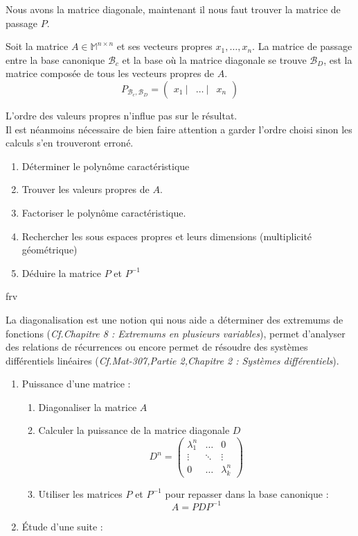Nous avons la matrice diagonale, maintenant il nous faut trouver la matrice de passage $P$.
\begin{prop}
Soit la matrice $A\in\mathbb{M}^{n\times n}$ et ses vecteurs propres $x_1,\hdots,x_n$.
La matrice de passage entre la base canonique $\mathscr{B}_c$ et la base où la matrice diagonale se trouve $\mathscr{B}_D$, est la matrice composée de tous les vecteurs propres de $A$.
$$P_{\mathscr{B}_c,\mathscr{B}_D}=\begin{pmatrix}x_1\ |& \hdots\ | & x_n\end{pmatrix}$$
\end{prop}

L'ordre des valeurs propres n'influe pas sur le résultat.\\
Il est néanmoins nécessaire de bien faire attention a garder l'ordre choisi sinon les calculs s'en trouveront erroné.
\begin{meth}
\begin{enumerate}
    \item Déterminer le polynôme caractéristique
    \item Trouver les valeurs propres de $A$.
    \item Factoriser le polynôme caractéristique.
    \item Rechercher les sous espaces propres et leurs dimensions (multiplicité géométrique)
    \item Déduire la matrice $P$ et $P^{-1}$
\end{enumerate}
\end{meth}
\begin{ex}
frv
\end{ex}
La diagonalisation est une notion qui nous aide a déterminer des extremums de fonctions (\textit{Cf.Chapitre 8 : Extremums en plusieurs variables}), permet d'analyser des relations de récurrences ou encore permet de résoudre des systèmes différentiels linéaires (\textit{Cf.Mat-307,Partie 2,Chapitre 2 : Systèmes différentiels}).
\begin{meth}[]
\begin{enumerate}
    \item Puissance d'une matrice :
    \begin{enumerate}
        \item Diagonaliser la matrice $A$
        \item Calculer la puissance de la matrice diagonale $D$ $$D^n=\begin{pmatrix}\lambda_1^n&\hdots&0\\\vdots&\ddots&\vdots\\0&\hdots&\lambda_k^n\end{pmatrix}$$
        \item Utiliser les matrices $P$ et $P^{-1}$ pour repasser dans la base canonique : $$A=PDP^{-1}$$
    \end{enumerate}
    \item Étude d'une suite :
\end{enumerate}
\end{meth}
